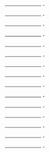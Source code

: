 \documentclass[11pt]{article}
\begin{document}
\begin{center}
\begin{multicols}{5}

    \begin{equation} \text{\line(1,0){45}\,.} \end{equation}

    \begin{equation} \text{\line(1,0){45}\,.} \end{equation}

    \begin{equation} \text{\line(1,0){45}\,.} \end{equation}

    \begin{equation} \text{\line(1,0){45}\,.} \end{equation}

    \begin{equation} \text{\line(1,0){45}\,.} \end{equation}

    \begin{equation} \text{\line(1,0){45}\,.} \end{equation}

    \begin{equation} \text{\line(1,0){45}\,.} \end{equation}

    \begin{equation} \text{\line(1,0){45}\,.} \end{equation}

    \begin{equation} \text{\line(1,0){45}\,.} \end{equation}

    \begin{equation} \text{\line(1,0){45}\,.} \end{equation}

    \begin{equation} \text{\line(1,0){45}\,.} \end{equation}

    \begin{equation} \text{\line(1,0){45}\,.} \end{equation}

    \begin{equation} \text{\line(1,0){45}\,.} \end{equation}

    \begin{equation} \text{\line(1,0){45}\,.} \end{equation}

    \begin{equation} \text{\line(1,0){45}\,.} \end{equation}

\end{multicols}
\end{center}
\end{document}
